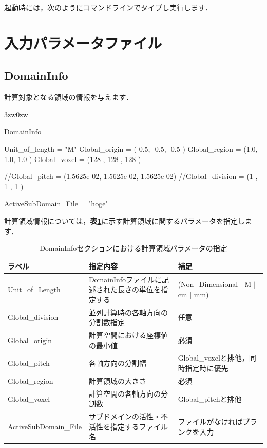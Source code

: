 起動時には，次のようにコマンドラインでタイプし実行します．
{
\small 
{}
}




\pagebreak
\section{入力パラメータファイル}


%
\subsection{DomainInfo}

計算対象となる領域の情報を与えます．

\begin{indentation}{3zw}{0zw}

{\small
\begin{program}
DomainInfo {
  Unit_of_length  = "M"
  Global_origin   = (-0.5, -0.5, -0.5   )
  Global_region   = (1.0,  1.0,  1.0    )
  Global_voxel    = (128   , 128   , 128   )
  
  //Global_pitch    = (1.5625e-02, 1.5625e-02, 1.5625e-02)
  //Global_division = (1    , 1    , 1    )

  ActiveSubDomain_File = "hoge"
}
\end{program}
}

計算領域情報については，\textbf{表\ref{tbl:region_info}}に示す計算領域に関するパラメータを指定します．

\begin{table}[htdp]
\caption{DomainInfoセクションにおける計算領域パラメータの指定}
\begin{center}
\small
\begin{tabular}{lll} \toprule
ラベル & 指定内容 & 補足\\ \midrule
Unit\_of\_Length & DomainInfoファイルに記述された長さの単位を指定する & (Non\_Dimensional $|$ M $|$ cm $|$ mm)\\
Global\_division & 並列計算時の各軸方向の分割数指定 & 任意\\ 
Global\_origin & 計算空間における座標値の最小値 & 必須\\
Global\_pitch & 各軸方向の分割幅 &Global\_voxelと排他，同時指定時に優先\\
Global\_region & 計算領域の大きさ & 必須\\ 
Global\_voxel & 計算空間の各軸方向の分割数 & Global\_pitchと排他\\
ActiveSubDomain\_File & サブドメインの活性・不活性を指定するファイル名 & ファイルがなければブランクを入力\\ \bottomrule
\end{tabular}
\end{center}
\label{tbl:region_info}
\end{table}

\end{indentation}



